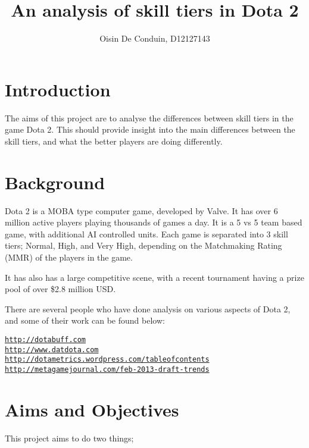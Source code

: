 \documentclass[11pt]{article}
\title{An analysis of skill tiers in Dota 2}
\author{Oisin De Conduin, D12127143}
\begin{document}
\maketitle

\section{Introduction}
The aims of this project are to analyse the differences between skill tiers in the game Dota 2. This should provide insight into the main differences between the skill tiers, and what the better players are doing differently. 

\section{Background}
Dota 2 is a MOBA type computer game, developed by Valve. It has over 6 million active players playing thousands of games a day. It is a 5 vs 5 team based game, with additional AI controlled units. Each game is separated into 3 skill tiers; Normal, High, and Very High, depending on the Matchmaking Rating (MMR) of the players in the game.

\vspace{3mm}

It has also has a large competitive scene, with a recent tournament having a prize pool of over \$2.8 million USD.

\vspace{3mm}

There are several people who have done analysis on various aspects of Dota 2, and some of their work can be found below: 

\vspace{3mm}

\href{http://dotabuff.com}{\tt http://dotabuff.com}\\
\href{http://www.datdota.com}{\tt http://www.datdota.com}\\
\href{http://dotametrics.wordpress.com/tableofcontents}{\tt http://dotametrics.wordpress.com/tableofcontents}\\
\href{http://metagamejournal.com/feb-2013-draft-trends}{\tt http://metagamejournal.com/feb-2013-draft-trends}
\section{Aims and Objectives}
This project aims to do two things;

\vspace{3mm}
\end{document}

